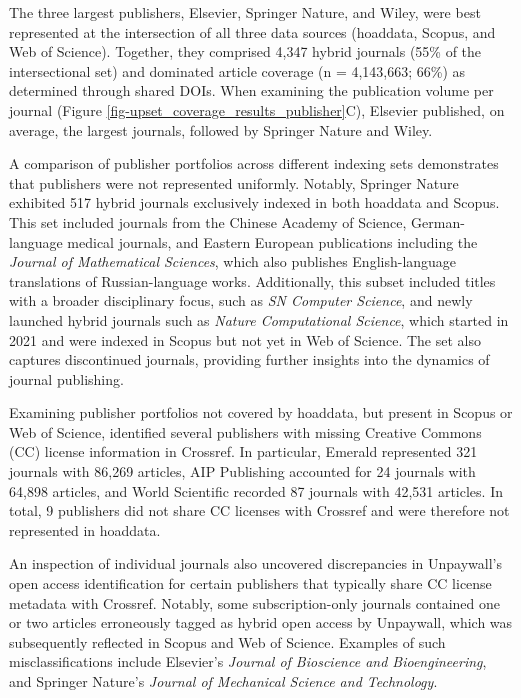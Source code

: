 \documentclass[a4paper,man,floatsintext,longtable,noextraspace,10pt]{apa6}
\begin{document}
The three largest publishers, Elsevier, Springer Nature, and Wiley, were
best represented at the intersection of all three data sources
(hoaddata, Scopus, and Web of Science). Together, they comprised 4,347
hybrid journals (55\% of the intersectional set) and dominated article
coverage (n = 4,143,663; 66\%) as determined through shared DOIs. When
examining the publication volume per journal (Figure
\ref{fig-upset_coverage_results_publisher}C), Elsevier published, on
average, the largest journals, followed by Springer Nature and Wiley.

A comparison of publisher portfolios across different indexing sets
demonstrates that publishers were not represented uniformly. Notably,
Springer Nature exhibited 517 hybrid journals exclusively indexed in
both hoaddata and Scopus. This set included journals from the Chinese
Academy of Science, German-language medical journals, and Eastern
European publications including the \emph{Journal of Mathematical
Sciences}, which also publishes English-language translations of
Russian-language works. Additionally, this subset included titles with a
broader disciplinary focus, such as \emph{SN Computer Science}, and
newly launched hybrid journals such as \emph{Nature Computational
Science}, which started in 2021 and were indexed in Scopus but not yet
in Web of Science. The set also captures discontinued journals,
providing further insights into the dynamics of journal publishing.

Examining publisher portfolios not covered by hoaddata, but present in
Scopus or Web of Science, identified several publishers with missing
Creative Commons (CC) license information in Crossref. In particular,
Emerald represented 321 journals with 86,269 articles, AIP Publishing
accounted for 24 journals with 64,898 articles, and World Scientific
recorded 87 journals with 42,531 articles. In total, 9 publishers did
not share CC licenses with Crossref and were therefore not represented
in hoaddata.

An inspection of individual journals also uncovered discrepancies in
Unpaywall's open access identification for certain publishers that
typically share CC license metadata with Crossref. Notably, some
subscription-only journals contained one or two articles erroneously
tagged as hybrid open access by Unpaywall, which was subsequently
reflected in Scopus and Web of Science. Examples of such
misclassifications include Elsevier's \emph{Journal of Bioscience and
Bioengineering}, and Springer Nature's \emph{Journal of Mechanical
Science and Technology}.
\end{document}
